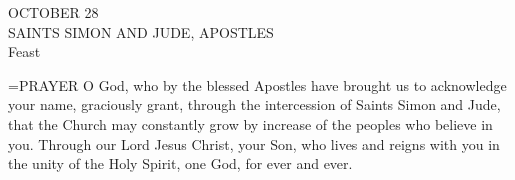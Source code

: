 \begin{center}\normalsize OCTOBER 28\\
\footnotesize SAINTS SIMON AND JUDE, APOSTLES\\
\footnotesize Feast\\
\end{center}

\hangindent=\parindent \small{PRAYER 
O God, who by the blessed Apostles
have brought us to acknowledge your name,
graciously grant,
through the intercession of Saints Simon and Jude,
that the Church may constantly grow
by increase of the peoples who believe in you.
Through our Lord Jesus Christ, your Son,
who lives and reigns with you in the unity of the Holy Spirit,
one God, for ever and ever.\\}
 
